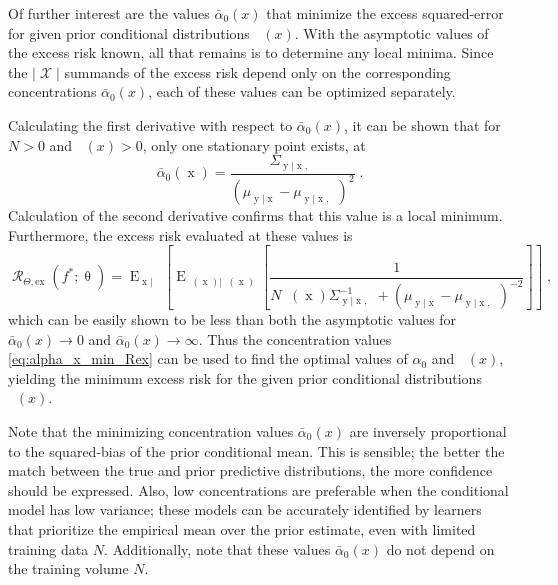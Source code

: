 \documentclass[12pt]{report}
\newcommand{\todomid}[1]{\todo[inline,color=yellow!50,linecolor=red]{#1}}
\DeclareMathOperator{\xrm}{\mathrm{x}}
\DeclareMathOperator{\yrm}{\mathrm{y}}
\DeclareMathOperator{\Erm}{\mathrm{E}}
\DeclareMathOperator{\Xcal}{\mathcal{X}}
\DeclareMathOperator{\Rcal}{\mathcal{R}}
\DeclareMathOperator{\thetam}{\theta_\text{m}}
\DeclareMathOperator{\upthetam}{\uptheta_\text{m}}
\DeclareMathOperator{\upthetac}{\uptheta_\text{c}}
\DeclareMathOperator{\uppsim}{\uppsi_\text{m}}
\DeclareMathOperator{\alpham}{\alpha_\text{m}}
\DeclareMathOperator{\alphac}{\alpha_\text{c}}
\begin{document}
Of further interest are the values $\bar{\alpha}_0(x)$ that minimize the excess squared-error for given prior conditional distributions $\alphac(x)$. With the asymptotic values of the excess risk known, all that remains is to determine any local minima. Since the $|\Xcal|$ summands of the excess risk depend only on the corresponding concentrations $\bar{\alpha}_0(x)$, each of these values can be optimized separately. 

\todomid{add the derivative details below???}

Calculating the first derivative with respect to $\bar{\alpha}_0(x)$, it can be shown that for $N > 0$ and $\thetam(x) > 0$, only one stationary point exists, at 
\begin{equation} \label{eq:alpha_x_min_Rex}
\bar{\alpha}_0(\xrm) = \frac{\Sigma_{\yrm | \xrm,\upthetac}}{\left( \mu_{\yrm | \xrm} - \mu_{\yrm | \xrm,\upthetac} \right)^2} \;.
\end{equation}
Calculation of the second derivative confirms that this value is a local minimum. Furthermore, the excess risk evaluated at these values is 
\begin{equation}
\Rcal_{\Theta, \mathrm{ex}}(f^* ; \uptheta) = \Erm_{\xrm | \upthetam}\left[ \Erm_{\uppsim(\xrm) | \upthetam(\xrm)}\left[ \frac{1}{N \uppsim(\xrm) \Sigma_{\yrm | \xrm,\upthetac}^{-1} + \left( \mu_{\yrm | \xrm} - \mu_{\yrm | \xrm,\upthetac} \right)^{-2}} \right] \right] \;,
\end{equation}
which can be easily shown to be less than both the asymptotic values for $\bar{\alpha}_0(x) \to 0$ and $\bar{\alpha}_0(x) \to \infty$. Thus the concentration values \eqref{eq:alpha_x_min_Rex} can be used to find the optimal values of $\alpha_0$ and $\alpham(x)$, yielding the minimum excess risk for the given prior conditional distributions $\alphac(x)$.

Note that the minimizing concentration values $\bar{\alpha}_0(x)$ are inversely proportional to the squared-bias of the prior conditional mean. This is sensible; the better the match between the true and prior predictive distributions, the more confidence should be expressed. Also, low concentrations are preferable when the conditional model has low variance; these models can be accurately identified by learners that prioritize the empirical mean over the prior estimate, even with limited training data $N$. Additionally, note that these values $\bar{\alpha}_0(x)$ do not depend on the training volume $N$.
\end{document}
